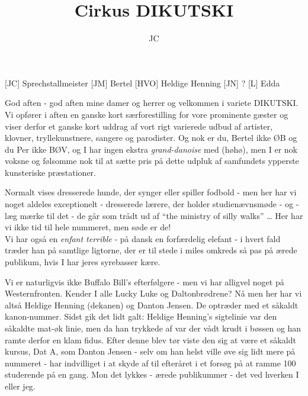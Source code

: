 \documentclass[a4paper,11pt]{article}
\title{Cirkus DIKUTSKI}
\author{JC}
\begin{document}
\maketitle

\begin{roles}
[JC] Sprechstallmeister
[JM] Bertel
[HVO] Heldige Henning
[JN] ?
[L] Edda
\end{roles}

\begin{sketch}

 God aften - god aften mine damer og herrer og velkommen i variete DIKUTSKI.  Vi opfører i aften en ganske kort særforestilling for vore prominente gæster og viser derfor et ganske kort uddrag af vort rigt varierede udbud af artister, klovner, tryllekunstnere, sangere og parodister.  Og nok er du, Bertel ikke ØB og du Per ikke BØV, og I har ingen ekstra \emph{grand-danoise} med (høhø), men I er nok voksne og følsomme nok til at sætte pris på dette udpluk af samfundets ypperste kunsteriske præstationer.


 Normalt vises dresserede hunde, der synger eller spiller fodbold - men her har vi noget aldeles exceptionelt - dresserede lærere, der holder studienævnsmøde - og - læg mærke til det - de går som trådt ud af ``the ministry of silly walks'' \ldots {} Her har vi ikke tid til hele nummeret, men søde er de!\\
Vi har også en \emph{enfant terrible} - på dansk en forfærdelig elefant - i hvert fald træder han på samtlige ligtorne, der er til stede i miles omkreds så pas på ærede publikum, hvis I har jeres syrebasser kære.



 Vi er naturligvis ikke Buffalo Bill's efterfølgere - men vi har alligvel noget på Westernfronten.  Kender I alle Lucky Luke og Daltonbrødrene?  Nå men her har vi altså Heldige Henning (dekanen) og Danton Jensen.  De optræder med et såkaldt kanon-nummer.  Sidst gik det lidt galt: Heldige Henning's sigtelinie var den såkaldte mat-øk linie, men da han trykkede af var der vådt krudt i bøssen og han ramte derfor en klam fidus.  Efter denne blev tør viste den sig at være et såkaldt kursus, Dat A, som Danton Jensen - selv om han helst ville øve sig lidt mere på nummeret - har indvilliget i at skyde af til efteråret i et forsøg på at ramme 100 studerende på en gang.  Mon det lykkes - ærede publikummer - det ved hverken I eller jeg.


\end{sketch}
\end{document}
